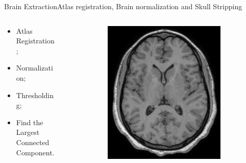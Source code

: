 \documentclass[]{standalone}
\begin{document}
	\begin{frame}{Brain Extraction}{Atlas registration, Brain normalization and Skull Stripping}
	
	\vspace{-25pt}
		\begin{columns}
			\begin{column}{0.45\textwidth}
				\begin{itemize}
				\item Atlas Registration;
				\item Normalization;
				\item Thresholding;
				\item Find the Largest Connected Component.
				\end{itemize}
			\end{column}
			\begin{column}{0.55\textwidth}
			\begin{figure}[h!]
			\centering
			\vspace{-6pt}
				\begin{subfigure}{0.45\textwidth}
					\centering
					\includegraphics[scale=0.05]{./IMG/T1.jpg}
				\end{subfigure}

\end{figure}
\end{column}
\end{columns}
\end{frame}
\end{document}
